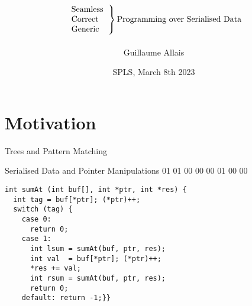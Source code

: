 \documentclass{beamer}
\title{
  \[
  \left.
    \begin{tabular}{l}
      Seamless \\
      Correct \\
      Generic
    \end{tabular}
  \right\}
  \text{Programming over Serialised Data}
  \]}
\author{Guillaume Allais}
\institute{University of St Andrews}
\date{SPLS, March 8th 2023}
\newcommand{\hexadata}[1]{\texttt{\IdrisData{#1}}}
\newenvironment{hexdump}{\medskip\ttfamily\obeyspaces\obeylines\noindent}{\medskip}
\begin{document}
\begin{frame}
  \maketitle
\end{frame}

\section{Motivation}

\newcommand{\mknode}[3]{\draw (#1,#2)  circle (.27cm) node[align=center] {\IdrisData{#3}};}
\newcommand{\mkleaf}[2]{\draw[fill=black] (#1,#2) node[align=center] {} +(-.1cm,-.1cm) rectangle +(.1cm,.1cm);}

\begin{frame}{Trees and Pattern Matching}
\begin{minipage}{.5\textwidth}
\end{minipage}\hfill
\begin{minipage}{.45\textwidth}
\end{minipage}
\end{frame}

\begin{frame}[fragile]{Serialised Data and Pointer Manipulations}
\begin{hexdump}
01 01 01 00 \hexadata{01} 00 \hexadata{05} 00 \hexadata{0a} 01 00 \hexadata{14} 00
\end{hexdump}

\begin{lstlisting}
int sumAt (int buf[], int *ptr, int *res) {
  int tag = buf[*ptr]; (*ptr)++;
  switch (tag) {
    case 0:
      return 0;
    case 1:
      int lsum = sumAt(buf, ptr, res);
      int val  = buf[*ptr]; (*ptr)++;
      *res += val;
      int rsum = sumAt(buf, ptr, res);
      return 0;
    default: return -1;}}
\end{lstlisting}
\end{frame}
\end{document}
